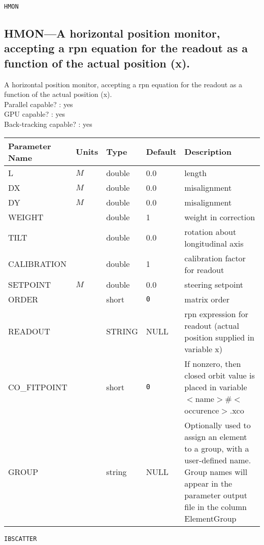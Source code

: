 \vspace*{0.5in}

\newpage
\begin{center}{\Large\verb|HMON|}\end{center}
\subsection{HMON---A horizontal position monitor, accepting a rpn equation for the readout as a function of the actual position (x).}
A horizontal position monitor, accepting a rpn equation for the readout as a function of the actual position (x).
\\
Parallel capable? : yes\\
GPU capable? : yes\\
Back-tracking capable? : yes\\
\begin{tabular}{|l|l|l|l|p{\descwidth}|} \hline
Parameter Name & Units & Type & Default & Description \\ \hline 
L & $M$ & double &  0.0 & length  \\ \hline 
DX & $M$ & double &  0.0 & misalignment  \\ \hline 
DY & $M$ & double &  0.0 & misalignment  \\ \hline 
WEIGHT &  & double &   1 & weight in correction  \\ \hline 
TILT &  & double &  0.0 & rotation about longitudinal axis  \\ \hline 
CALIBRATION &  & double &   1 & calibration factor for readout  \\ \hline 
SETPOINT & $M$ & double &  0.0 & steering setpoint  \\ \hline 
ORDER &  & short &  \verb|0| & matrix order  \\ \hline 
READOUT &  & STRING &   NULL            & rpn expression for readout (actual position supplied in variable x)  \\ \hline 
CO\_FITPOINT &  & short &  \verb|0| & If nonzero, then closed orbit value is placed in variable $<$name$>$\#$<$occurence$>$.xco  \\ \hline 
GROUP &  & string & NULL & Optionally used to assign an element to a group, with a user-defined name.  Group names will appear in the parameter output file in the column ElementGroup  \\ \hline 
\end{tabular}

\newpage
\begin{center}{\Large\verb|IBSCATTER|}\end{center}
